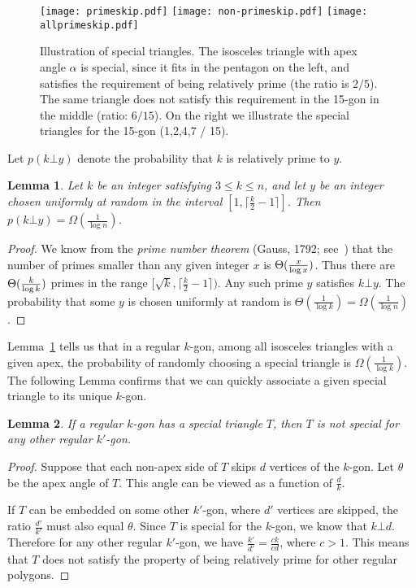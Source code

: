 \documentclass{article}
\newtheorem{lemma}{Lemma}
\begin{document}
\begin{figure}[h!]
\center
\texttt{[image: primeskip.pdf]}
\texttt{[image: non-primeskip.pdf]}
\texttt{[image: allprimeskip.pdf]}
\caption{Illustration of special triangles. The isosceles triangle with apex angle $\alpha$ is special, since it fits in the pentagon on the left, and satisfies the requirement of being relatively prime (the ratio is $2/5$).  
The same triangle does not satisfy this requirement in the 15-gon in the middle (ratio: $6/15$).   On the right
we illustrate the special triangles for the 15-gon (1,2,4,7 / 15).}
\label{fig:special}
\end{figure}


\noindent Let $p(k\bot y)$ denote the probability that $k$ is relatively prime to $y$.
\begin{lemma}
\label{relativelyprimelemma} Let $k$ be an integer satisfying $3{\leq}k{\leq}n$, and let $y$ be
an  integer chosen uniformly at random in the interval 
$[1, \lceil\frac{k}{2}-1 \rceil ]$.  
  Then  $p(k\bot y) = \Omega(\frac{1}{\log n})$.
\end{lemma}
\begin{proof}
We know from the {\em prime number theorem} (Gauss, 1792;
see~\cite{havil})
that the number of primes smaller than
any given integer $x$ is $\Theta({x\over \log x})$. 
Thus there are  $\Theta({k \over \log k})$ primes in the
range $[\sqrt{k} ,\lceil \frac{k}{2}-1 \rceil )$.   Any such prime $y$  satisfies $k\bot y$.
The probability that some $y$ is chosen uniformly at random is 
$\Theta(\frac{1}{\log k}) = 
\Omega(\frac{1}{\log n})$.
\end{proof}
Lemma~\ref{relativelyprimelemma} tells us that in a regular $k$-gon, among all isosceles 
triangles with a given apex, the probability of randomly choosing a special triangle is
$\Omega(\frac{1}{\log k})$.
The following Lemma confirms that we can quickly associate a given special triangle to its
unique $k$-gon.
\begin{lemma}
\label{lem:unique}
If a regular $k$-gon has a special triangle $T$, then $T$ is not special for any other regular $k'$-gon.
\end{lemma}
\begin{proof}
Suppose that each non-apex side of $T$ skips $d$ vertices of the $k$-gon.
Let $\theta$ be the apex angle of $T$.  This angle can be viewed as a function of $\frac{d}{k}$.

If $T$ can be embedded on some other $k'$-gon, where $d'$ vertices are skipped, 
the ratio $\frac{d'}{k'}$ must also equal $\theta$.
Since $T$ is special for the $k$-gon, we know that $k\bot d$.  Therefore for any other
regular $k'$-gon, we have $\frac{k'}{d'}=\frac{ck}{cd}$, where $c>1$.  This means that
$T$ does not satisfy the property of being relatively prime for other regular polygons.
\end{proof}
\end{document}
